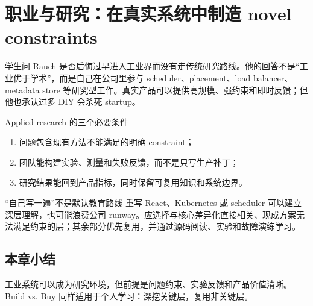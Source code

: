 \section{职业与研究：在真实系统中制造 novel constraints}

学生问 Rauch 是否后悔过早进入工业界而没有走传统研究路线。他的回答不是“工业优于学术”，而是自己在公司里参与 scheduler、placement、load balancer、metadata store 等研究型工作。真实产品可以提供高规模、强约束和即时反馈；但他也承认过多 DIY 会杀死 startup。

\begin{knowledgebox}{Applied research 的三个必要条件}
\begin{enumerate}
  \item 问题包含现有方法不能满足的明确 constraint；
  \item 团队能构建实验、测量和失败反馈，而不是只写生产补丁；
  \item 研究结果能回到产品指标，同时保留可复用知识和系统边界。
\end{enumerate}
\end{knowledgebox}

\begin{warningbox}{“自己写一遍”不是默认教育路线}
重写 React、Kubernetes 或 scheduler 可以建立深层理解，也可能浪费公司 runway。应选择与核心差异化直接相关、现成方案无法满足约束的层；其余部分优先复用，并通过源码阅读、实验和故障演练学习。
\end{warningbox}


\subsection{本章小结}

工业系统可以成为研究环境，但前提是问题约束、实验反馈和产品价值清晰。Build vs. Buy 同样适用于个人学习：深挖关键层，复用非关键层。

